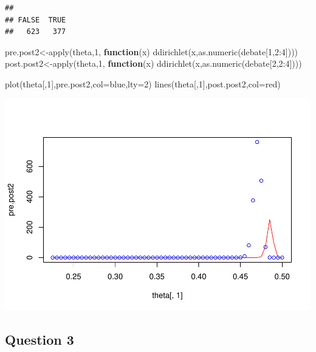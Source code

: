 \documentclass[
]{book}
\newenvironment{Shaded}{\begin{snugshade}}{\end{snugshade}}
\newcommand{\AttributeTok}[1]{\textcolor[rgb]{0.77,0.63,0.00}{#1}}
\newcommand{\ControlFlowTok}[1]{\textcolor[rgb]{0.13,0.29,0.53}{\textbf{#1}}}
\newcommand{\DecValTok}[1]{\textcolor[rgb]{0.00,0.00,0.81}{#1}}
\newcommand{\FunctionTok}[1]{\textcolor[rgb]{0.00,0.00,0.00}{#1}}
\newcommand{\NormalTok}[1]{#1}
\newcommand{\OtherTok}[1]{\textcolor[rgb]{0.56,0.35,0.01}{#1}}
\newcommand{\SpecialCharTok}[1]{\textcolor[rgb]{0.00,0.00,0.00}{#1}}
\newcommand{\StringTok}[1]{\textcolor[rgb]{0.31,0.60,0.02}{#1}}
\theoremstyle{definition}
\theoremstyle{definition}
\theoremstyle{definition}
\theoremstyle{definition}
\theoremstyle{remark}
\begin{document}
\begin{verbatim}
## 
## FALSE  TRUE 
##   623   377
\end{verbatim}

\begin{Shaded}
\begin{Highlighting}[]
\NormalTok{ pre.post2}\OtherTok{\textless{}{-}}\FunctionTok{apply}\NormalTok{(theta,}\DecValTok{1}\NormalTok{, }\ControlFlowTok{function}\NormalTok{(x) }\FunctionTok{ddirichlet}\NormalTok{(x,}\FunctionTok{as.numeric}\NormalTok{(debate[}\DecValTok{1}\NormalTok{,}\DecValTok{2}\SpecialCharTok{:}\DecValTok{4}\NormalTok{])))}
\NormalTok{ post.post2}\OtherTok{\textless{}{-}}\FunctionTok{apply}\NormalTok{(theta,}\DecValTok{1}\NormalTok{, }\ControlFlowTok{function}\NormalTok{(x) }\FunctionTok{ddirichlet}\NormalTok{(x,}\FunctionTok{as.numeric}\NormalTok{(debate[}\DecValTok{2}\NormalTok{,}\DecValTok{2}\SpecialCharTok{:}\DecValTok{4}\NormalTok{])))}
 
  \FunctionTok{plot}\NormalTok{(theta[,}\DecValTok{1}\NormalTok{],pre.post2,}\AttributeTok{col=}\StringTok{\textquotesingle{}blue\textquotesingle{}}\NormalTok{,}\AttributeTok{lty=}\DecValTok{2}\NormalTok{)}
  \FunctionTok{lines}\NormalTok{(theta[,}\DecValTok{1}\NormalTok{],post.post2,}\AttributeTok{col=}\StringTok{\textquotesingle{}red\textquotesingle{}}\NormalTok{)}
\end{Highlighting}
\end{Shaded}

\includegraphics{_main_files/figure-latex/unnamed-chunk-30-2.pdf}

\hypertarget{question-3-1}{%
\subsection*{Question 3}\label{question-3-1}}
\end{document}
